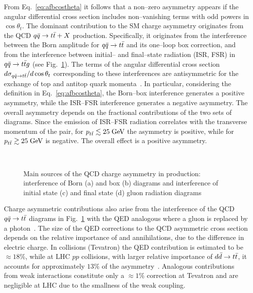 From Eq.~\ref{eq:afbcostheta} it follows that a non--zero asymmetry
appears if the angular differential cross section includes
non--vanishing terms with odd powers in $\cos\theta_t$.
The dominant contribution to the SM charge asymmetry originates from
the QCD \mbox{$q\bar{q}{}\to t\bar{t}{}+X$} production. Specifically, it originates from the
interference between the Born amplitude for \mbox{$q\bar{q}{}\to t\bar{t}{}$} and
its one--loop box correction, and from the interference between initial-- and final--state radiation (ISR, FSR) in \mbox{$q\bar{q}{}\to{}t\bar{t}{}g$}
(see Fig.~\ref{fig:asymdiagrams}). The terms of the angular differential cross section
$d\sigma_{q\bar{q}{}\to{}t\bar{t}{}}/d\cos\theta_t$ corresponding to these
interferences are antisymmetric for the exchange of top and antitop
quark momenta~\cite{Kuhn:1998kw}. In particular, considering the
definition in Eq.~\ref{eq:afbcostheta}, the Born--box interference
generates a positive asymmetry, while the ISR--FSR interference
generates a negative asymmetry.
The overall asymmetry depends on the fractional contributions of the two
sets of diagrams. Since the emission of ISR--FSR radiation correlates
with the transverse momentum \pttt{} of the \ttbar{} pair, for
$p_{t\bar{t}}{}\lesssim{}25\; \mathrm{GeV}{}$ the asymmetry is positive, while for
$p_{t\bar{t}}{}\gtrsim{}25\; \mathrm{GeV}{}$ is negative. The overall effect is a
positive asymmetry.
\begin{figure}[!htb]
  \centering
   \quad
   \\
   \quad
  \caption{Main sources of the QCD charge asymmetry in \ttbar{}
    production: interference of Born (a) and box (b) diagrams and
    interference of initial state (c) and final state (d) gluon
    radiation diagrams}
  \label{fig:asymdiagrams}
\end{figure}

Charge asymmetric contributions also arise from the interference of
the QCD \mbox{$q\bar{q}{}\to{}t\bar{t}{}$} diagrams in
Fig.~\ref{fig:asymdiagrams} with the QED analogous where a gluon is
replaced by a photon~\cite{Hollik:2011ps}. The size of the QED
corrections to the QCD asymmetric cross section depends on the
relative importance of \uubar{} and \ddbar{} annihilations, due to the
difference in electric charge.
In \ppbar{} collisions (Tevatron) the QED contribution is estimated to
be $\approx{}18\%$, while at LHC $pp$ collisions, with larger relative
importance of $d\bar{d}{}\to t\bar{t}{}$, it accounts for approximately $13\%$ of the
asymmetry~\cite{Kuhn:2011ri}.
Analogous contributions from weak interactions constitute only a
$\approx{}1\%$ correction at Tevatron and are negligible at LHC due to
the smallness of the weak coupling.

